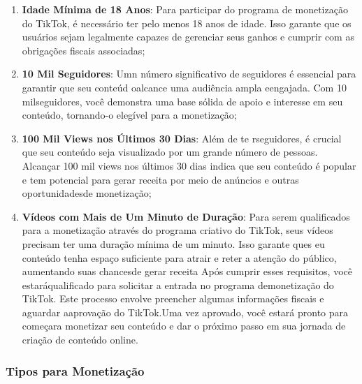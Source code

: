 \begin{enumerate}
    \item \textbf{Idade Mínima de 18 Anos}: Para participar do programa de monetização do TikTok, é necessário ter pelo menos 18 anos de idade. Isso garante que os usuários sejam legalmente capazes de gerenciar seus ganhos e cumprir com as obrigações fiscais associadas;
    \item \textbf{10 Mil Seguidores}: Umn número significativo de seguidores é essencial para garantir que seu conteúd oalcance uma audiência ampla eengajada. Com 10 milseguidores, você demonstra uma base sólida de apoio e interesse em seu conteúdo, tornando-o elegível para a monetização;
    \item \textbf{100 Mil Views nos Últimos 30 Dias}: Além de te rseguidores, é crucial que seu conteúdo seja visualizado por um grande número de pessoas. Alcançar 100 mil views nos últimos 30 dias indica que seu conteúdo é popular e tem potencial para gerar receita por meio de anúncios e outras oportunidadesde monetização;
    \item \textbf{Vídeos com Mais de Um Minuto de Duração}: Para serem qualificados para a monetização através do programa criativo do TikTok, seus vídeos precisam ter uma duração mínima de um minuto. Isso garante ques eu conteúdo tenha espaço suficiente para atrair e reter a atenção do público, aumentando suas chancesde gerar receita Após cumprir esses requisitos, você estaráqualificado para solicitar a entrada no programa demonetização do TikTok. Este processo envolve preencher algumas informações fiscais e aguardar aaprovação do TikTok.Uma vez aprovado, você estará pronto para começara monetizar seu conteúdo e dar o próximo passo em sua jornada de criação de conteúdo online.
    \end{enumerate}


\subsubsection{Tipos para Monetização}

